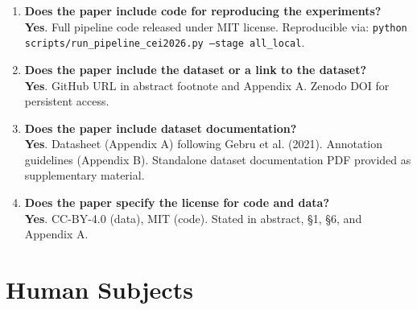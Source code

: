 \documentclass[11pt]{article}
\newcommand{\yes}{\textcolor{green!60!black}{\textbf{Yes}}}
\begin{document}
\begin{enumerate}[leftmargin=*]
    \item \textbf{Does the paper include code for reproducing the experiments?} \\
    \yes. Full pipeline code released under MIT license. Reproducible via: \texttt{python scripts/run\_pipeline\_cei2026.py --stage all\_local}.

    \item \textbf{Does the paper include the dataset or a link to the dataset?} \\
    \yes. GitHub URL in abstract footnote and Appendix A. Zenodo DOI for persistent access.

    \item \textbf{Does the paper include dataset documentation?} \\
    \yes. Datasheet (Appendix A) following Gebru et al. (2021). Annotation guidelines (Appendix B). Standalone dataset documentation PDF provided as supplementary material.

    \item \textbf{Does the paper specify the license for code and data?} \\
    \yes. CC-BY-4.0 (data), MIT (code). Stated in abstract, \S1, \S6, and Appendix A.
\end{enumerate}

\section{Human Subjects}
\end{document}
